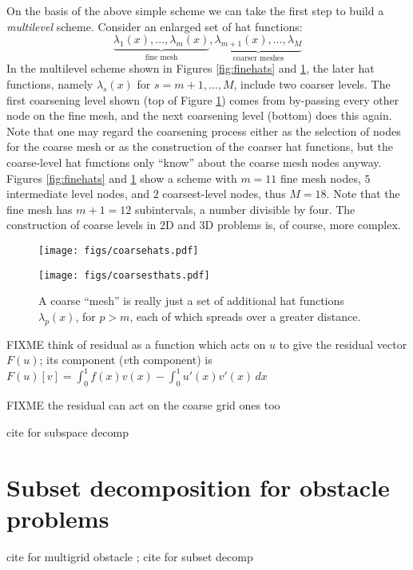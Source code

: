 \documentclass[letterpaper,final,12pt,reqno]{amsart}
\begin{document}
On the basis of the above simple scheme we can take the first step to build a \emph{multilevel} scheme.  Consider an enlarged set of hat functions:
    $$\underbrace{\lambda_1(x),\dots,\lambda_m(x)}_{\text{fine mesh}},\underbrace{\lambda_{m+1}(x),\dots,\lambda_M}_{\text{coarser meshes}}$$
In the multilevel scheme shown in Figures \ref{fig:finehats} and \ref{fig:coarsehats}, the later hat functions, namely $\lambda_s(x)$ for $s=m+1,\dots,M$, include two coarser levels.  The first coarsening level shown (top of Figure \ref{fig:coarsehats}) comes from by-passing every other node on the fine mesh, and the next coarsening level (bottom) does this again.  Note that one may regard the coarsening process either as the selection of nodes for the coarse mesh or as the construction of the coarser hat functions, but the coarse-level hat functions only ``know'' about the coarse mesh nodes anyway.  Figures \ref{fig:finehats} and \ref{fig:coarsehats} show a scheme with $m=11$ fine mesh nodes, $5$ intermediate level nodes, and $2$ coarsest-level nodes, thus $M=18$.  Note that the fine mesh has $m+1=12$ subintervals, a number divisible by four.  The construction of coarse levels in 2D and 3D problems is, of course, more complex.

\begin{figure}
\texttt{[image: figs/coarsehats.pdf]}
\medskip

\texttt{[image: figs/coarsesthats.pdf]}
\caption{A coarse ``mesh'' is really just a set of additional hat functions $\lambda_p(x)$, for $p>m$, each of which spreads over a greater distance.}
\label{fig:coarsehats}
\end{figure}

FIXME think of residual as a function which acts on $u$ to give the residual vector $F(u)$; its component ($v$th component) is $F(u)[v]=\int_0^1 f(x) v(x) - \int_0^1 u'(x)v'(x)\,dx$

FIXME the residual can act on the coarse grid ones too

cite for subspace decomp \cite{Xu1992}


\section{Subset decomposition for obstacle problems} \label{sec:obstacle}


cite for multigrid obstacle \cite{BrandtCryer1983,Bueler2021,GraeserKornhuber2009,Jouvetetal2013}; cite for subset decomp \cite{Tai2003}
\end{document}
